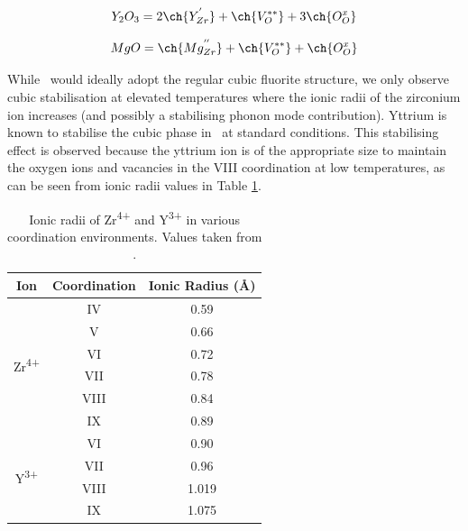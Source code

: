 \begin{equation}
Y_{2}O_{3} = 2\ch{Y_{Zr}^{'}} + \ch{V_{O}^{**}} + 3\ch{O_{O}^{x}} 
\label{equation:YSZ}
\end{equation}

\begin{equation}
MgO= \ch{Mg_{Zr}^{''}} + \ch{V_{O}^{**}} + \ch{O_{O}^{x}} 
\label{equation:mg_stabilised_zro2}
\end{equation}

While \zirconia\ would ideally adopt the regular cubic fluorite structure, we only observe cubic stabilisation at elevated temperatures where the ionic radii of the zirconium ion increases (and possibly a stabilising phonon mode contribution). Yttrium is known to stabilise the cubic phase in \zirconia\ at standard conditions. This stabilising effect is observed because the yttrium ion is of the appropriate size to maintain the oxygen ions and vacancies in the VIII coordination at low temperatures, as can be seen from ionic radii values in Table \ref{figure:ionicradii}. 


\begin{table}[htp]
\onehalfspacing
\centering
\caption[Ionic radii of Zr\textsuperscript{4+} and Y\textsuperscript{3+} in various coordination environments.]{Ionic radii of Zr\textsuperscript{4+} and Y\textsuperscript{3+} in various coordination environments. Values taken from \cite{Shannon1976}.}
\label{figure:ionicradii}
\begin{tabular}{ccc}
\hline
Ion & Coordination & Ionic Radius (\r{A}) \\ \hline
\multicolumn{1}{c}{\multirow{6}{*}{Zr\textsuperscript{4+}}} & \multicolumn{1}{c}{IV} & 0.59 \\
\multicolumn{1}{c}{} & \multicolumn{1}{c}{V} & 0.66 \\
\multicolumn{1}{c}{} & \multicolumn{1}{c}{VI} & 0.72 \\
\multicolumn{1}{c}{} & \multicolumn{1}{c}{VII} & 0.78 \\
\multicolumn{1}{c}{} & \multicolumn{1}{c}{VIII} & 0.84 \\
\multicolumn{1}{c}{} & \multicolumn{1}{c}{IX} & 0.89 \\ \hline
\multicolumn{1}{c}{\multirow{4}{*}{Y\textsuperscript{3+}}} & \multicolumn{1}{c}{VI} & 0.90 \\
\multicolumn{1}{c}{} & \multicolumn{1}{c}{VII} & 0.96 \\
\multicolumn{1}{c}{} & \multicolumn{1}{c}{VIII} & 1.019 \\
\multicolumn{1}{c}{} & \multicolumn{1}{c}{IX} & 1.075 \\ \hline
\end{tabular}
\end{table}

